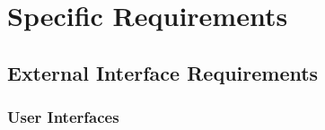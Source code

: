 \chapter{Specific Requirements}
\label{ch:requirements}

\section{External Interface Requirements}
\label{sec:interfaces}

\subsection{User Interfaces}

